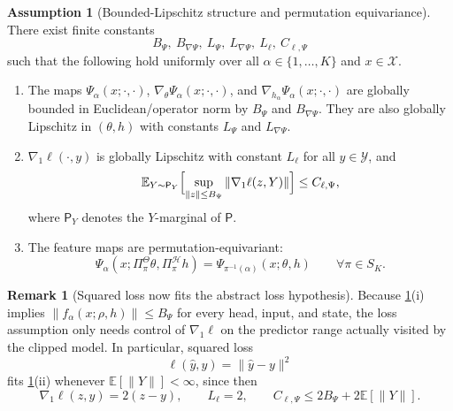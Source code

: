 \documentclass[11pt]{article}
\theoremstyle{definition}
\newtheorem{remark}[theorem]{Remark}
\newtheorem{assumption}[theorem]{Assumption}
\newcommand{\E}{\mathbb{E}}
\begin{document}
\begin{assumption}[Bounded-Lipschitz structure and permutation equivariance]
\label{ass:main}
There exist finite constants
\[
  B_\Psi,\ B_{\nabla\Psi},\ L_\Psi,\ L_{\nabla\Psi},\ L_\ell,\ C_{\ell,\Psi}
\]
such that the following hold uniformly over all $\alpha\in\{1,\dots,K\}$ and
$x\in\mathcal X$.
\begin{enumerate}[label=(\roman*),leftmargin=2em]
  \item The maps $\Psi_\alpha(x;\cdot,\cdot)$, $\nabla_\theta\Psi_\alpha(x;\cdot,\cdot)$,
  and $\nabla_{h_\alpha}\Psi_\alpha(x;\cdot,\cdot)$ are globally bounded in
  Euclidean/operator norm by $B_\Psi$ and $B_{\nabla\Psi}$. They are also
  globally Lipschitz in $(\theta,h)$ with constants $L_\Psi$ and
  $L_{\nabla\Psi}$.
  \item $\nabla_1\ell(\cdot,y)$ is globally Lipschitz with constant $L_\ell$
  for all $y\in\mathcal Y$, and
  \begin{equation}
    \E_{Y\sim\mathsf P_Y}
    \Bigl[
      \sup_{\|z\|\le B_\Psi}\|\nabla_1\ell(z,Y)\|
    \Bigr]
    \le
    C_{\ell,\Psi},
    \label{eq:loss-envelope}
  \end{equation}
  where $\mathsf P_Y$ denotes the $Y$-marginal of $\mathsf P$.
  \item The feature maps are permutation-equivariant:
  \begin{equation}
    \Psi_\alpha(x;\Pi_\pi^\Theta\theta,\Pi_\pi^\mathcal H h)
    =
    \Psi_{\pi^{-1}(\alpha)}(x;\theta,h)
    \qquad
    \forall \pi\in S_K.
    \label{eq:equiv}
  \end{equation}
\end{enumerate}
\end{assumption}

\begin{remark}[Squared loss now fits the abstract loss hypothesis]
\label{rem:squared-loss}
Because \cref{ass:main}(i) implies
\(
  \|f_\alpha(x;\rho,h)\|\le B_\Psi
\)
for every head, input, and state, the loss assumption only needs control of
$\nabla_1\ell$ on the predictor range actually visited by the clipped model. In
particular, squared loss
\[
  \ell(\widehat y,y)=\|\widehat y-y\|^2
\]
fits \cref{ass:main}(ii) whenever $\E[\|Y\|]<\infty$, since then
\[
  \nabla_1\ell(z,y)=2(z-y),
  \qquad
  L_\ell=2,
  \qquad
  C_{\ell,\Psi}\le 2B_\Psi+2\E[\|Y\|].
\]
\end{remark}
\end{document}
